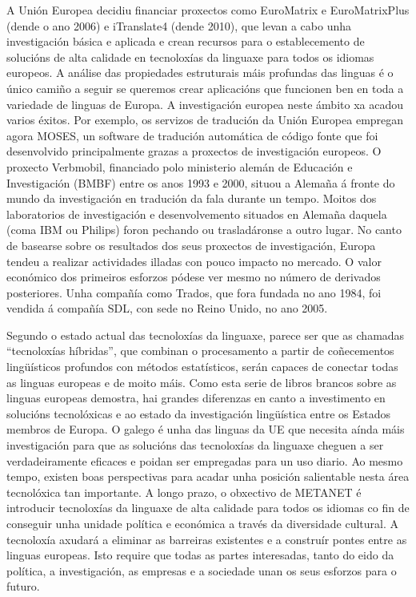 \begin{multicols}{2}
A Unión Europea decidiu financiar proxectos como EuroMatrix e EuroMatrixPlus (dende o ano 2006) e iTranslate4 (dende 2010), que  levan a cabo unha investigación básica e aplicada e crean recursos para o establecemento de solucións de alta calidade en tecnoloxías da linguaxe para todos os idiomas europeos. A análise das propiedades estruturais máis profundas das linguas é o único camiño a seguir se queremos crear aplicacións que funcionen ben en toda a variedade de linguas de Europa. 
A investigación europea neste ámbito xa acadou varios éxitos. Por exemplo, os servizos de tradución da Unión Europea empregan agora MOSES, un software de tradución automática de código fonte que foi desenvolvido principalmente grazas a proxectos de investigación europeos. O proxecto Verbmobil, financiado polo ministerio alemán de Educación e Investigación (BMBF) entre os anos 1993 e 2000, situou a Alemaña á fronte do mundo da investigación en tradución da fala durante un tempo. Moitos dos laboratorios de investigación e desenvolvemento situados en Alemaña daquela (coma IBM ou Philips) foron pechando ou trasladáronse a outro lugar. No canto de basearse sobre os resultados dos seus proxectos de investigación, Europa tendeu a realizar actividades illadas con pouco impacto no mercado. O valor económico dos primeiros esforzos pódese ver mesmo no número de derivados posteriores. Unha compañía como Trados, que fora fundada no ano 1984, foi vendida á compañía SDL, con sede no Reino Unido, no ano 2005.


Segundo o estado actual das tecnoloxías da linguaxe, parece ser que as chamadas “tecnoloxías híbridas”, que combinan o procesamento a partir de coñecementos lingüísticos profundos con métodos estatísticos, serán capaces de conectar todas as linguas europeas e de moito máis. Como esta serie de libros brancos sobre as linguas europeas demostra, hai grandes diferenzas en canto a investimento en solucións tecnolóxicas e ao estado da investigación lingüística entre os Estados membros de Europa.  O galego é unha das linguas da UE que necesita aínda máis investigación para que as solucións das tecnoloxías da linguaxe cheguen a ser verdadeiramente eficaces e poidan ser empregadas para un uso diario. Ao mesmo tempo, existen boas perspectivas para acadar unha posición salientable nesta área tecnolóxica tan importante. A longo prazo, o obxectivo de METANET é introducir tecnoloxías da linguaxe de alta calidade para todos os idiomas co fin de conseguir unha unidade política e económica a través da diversidade cultural. A tecnoloxía axudará a eliminar as barreiras existentes e a construír pontes entre as linguas europeas. Isto require que todas as partes interesadas, tanto do eido da política, a investigación, as empresas e a sociedade unan os seus esforzos para o futuro.


\end{multicols}
